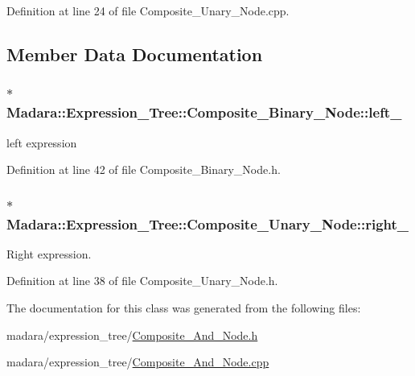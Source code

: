 Definition at line 24 of file Composite\_\-Unary\_\-Node.cpp.



\subsection{Member Data Documentation}
\hypertarget{classMadara_1_1Expression__Tree_1_1Composite__Binary__Node_acac60a70beb2484737e6e7161edb2d1b}{
\subsubsection[{left\_\-}]{$\ast$ {\bf Madara::Expression\_\-Tree::Composite\_\-Binary\_\-Node::left\_\-}}}
\label{df/d55/classMadara_1_1Expression__Tree_1_1Composite__Binary__Node_acac60a70beb2484737e6e7161edb2d1b}


left expression 



Definition at line 42 of file Composite\_\-Binary\_\-Node.h.

\hypertarget{classMadara_1_1Expression__Tree_1_1Composite__Unary__Node_a077b7bd1b52df6f5c6adfde735556a68}{
\subsubsection[{right\_\-}]{$\ast$ {\bf Madara::Expression\_\-Tree::Composite\_\-Unary\_\-Node::right\_\-}}}
\label{d3/dc7/classMadara_1_1Expression__Tree_1_1Composite__Unary__Node_a077b7bd1b52df6f5c6adfde735556a68}


Right expression. 



Definition at line 38 of file Composite\_\-Unary\_\-Node.h.



The documentation for this class was generated from the following files:\begin{DoxyCompactItemize}
\item 
madara/expression\_\-tree/\hyperlink{Composite__And__Node_8h}{Composite\_\-And\_\-Node.h}\item 
madara/expression\_\-tree/\hyperlink{Composite__And__Node_8cpp}{Composite\_\-And\_\-Node.cpp}\end{DoxyCompactItemize}
